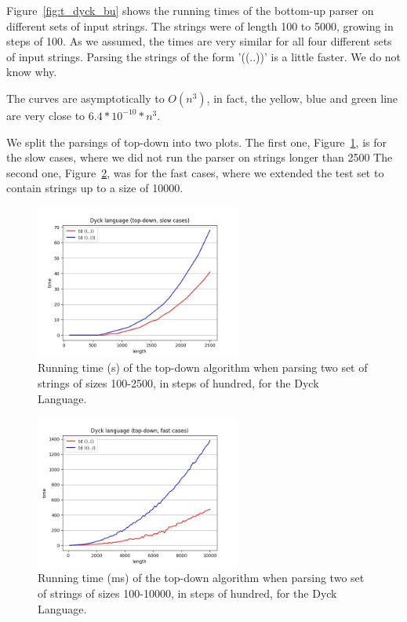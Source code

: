 Figure~\ref{fig:t_dyck_bu} shows the running times of the bottom-up parser on different sets of input strings.
The strings were of length 100 to 5000, growing in steps of 100.
As we assumed, the times are very similar for all four different sets of input strings.
Parsing the strings of the form '((..))' is a little faster.
We do not know why.

The curves are asymptotically to $O(n^3)$, in fact, the yellow, blue and green line are very close to $6.4*10^{-10}*n^3$.

We split the parsings of top-down into two plots.
The first one, Figure~\ref{fig:t_dyck_td_slow}, is for the slow cases, where we did not run the parser on strings longer than 2500
The second one, Figure~\ref{fig:t_dyck_td_fast}, was for the fast cases, where we extended the test set to contain strings up to a size of 10000.

\begin{figure}[h!]
    \centering
    \includegraphics[width=0.6\textwidth]{Images/t_dyck_td_slow.jpg}
    \caption{Running time (s) of the top-down algorithm when parsing two set of strings of sizes 100-2500, in steps of hundred, for the Dyck Language.}
    \label{fig:t_dyck_td_slow}
\end{figure}

\begin{figure}[h!]
    \centering
    \includegraphics[width=0.6\textwidth]{Images/t_dyck_td_fast.jpg}
    \caption{Running time (ms) of the top-down algorithm when parsing two set of strings of sizes 100-10000, in steps of hundred, for the Dyck Language.}
    \label{fig:t_dyck_td_fast}
\end{figure}

